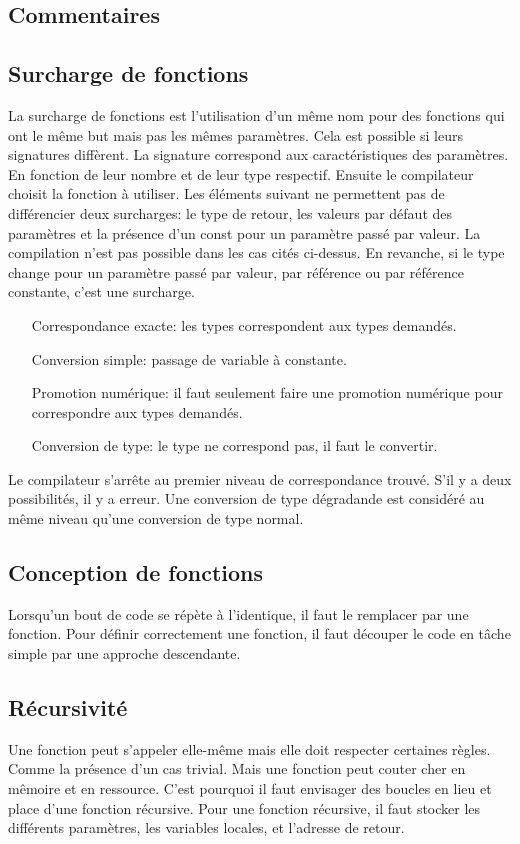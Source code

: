 \documentclass{article}
\begin{document}
\subsection{Commentaires}

\subsection{Surcharge de fonctions}
La surcharge de fonctions est l'utilisation d'un même nom pour des fonctions qui ont le même but mais pas les mêmes paramètres. Cela est possible si leurs signatures diffèrent. 
La signature correspond aux caractéristiques des paramètres. En fonction de leur nombre et de leur type respectif. Ensuite le compilateur choisit la fonction à utiliser. Les éléments suivant ne permettent pas de différencier deux surcharges: le type de retour, les valeurs par défaut des paramètres et la présence d'un const pour un paramètre passé par valeur. La compilation n'est pas possible dans les cas cités ci-dessus. En revanche, si le type change pour un paramètre passé par valeur, par référence ou par référence constante, c'est une surcharge. 
\bigskip
\begin{itemize}
    \item [Correspondance exacte:] les types correspondent aux types demandés. 
    \item [Conversion simple:] passage de variable à constante. 
    \item [Promotion numérique:] il faut seulement faire une promotion numérique pour correspondre aux types demandés.
    \item [Conversion de type:] le type ne correspond pas, il faut le convertir. 
\end{itemize}
\bigskip

Le compilateur s'arrête au premier niveau de correspondance trouvé. S'il y a deux possibilités, il y a erreur. Une conversion de type dégradande est considéré au même niveau qu'une conversion de type normal.
\subsection{Conception de fonctions}
Lorsqu'un bout de code se répète à l'identique, il faut le remplacer par une fonction. Pour définir correctement une fonction, il faut découper le code en tâche simple par une approche descendante. 
\subsection{Récursivité}
Une fonction peut s'appeler elle-même mais elle doit respecter certaines règles. Comme la présence d'un cas trivial. Mais une fonction peut couter cher en mêmoire et en ressource. C'est pourquoi il faut envisager des boucles en lieu et place d'une fonction récursive.
Pour une fonction récursive, il faut stocker les différents paramètres, les variables locales, et l'adresse de retour. 
\end{document}
